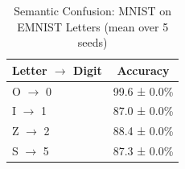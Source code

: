
\begin{table}[h]
\centering
\caption{Semantic Confusion: MNIST on EMNIST Letters (mean over 5 seeds)}
\label{tab:extension2_emnist_letters}
\begin{tabular}{lc}
\toprule
\textbf{Letter $\rightarrow$ Digit} & \textbf{Accuracy} \\
\midrule
O $\rightarrow$ 0 & 99.6 ± 0.0\% \\
I $\rightarrow$ 1 & 87.0 ± 0.0\% \\
Z $\rightarrow$ 2 & 88.4 ± 0.0\% \\
S $\rightarrow$ 5 & 87.3 ± 0.0\% \\
\bottomrule
\end{tabular}
\end{table}
